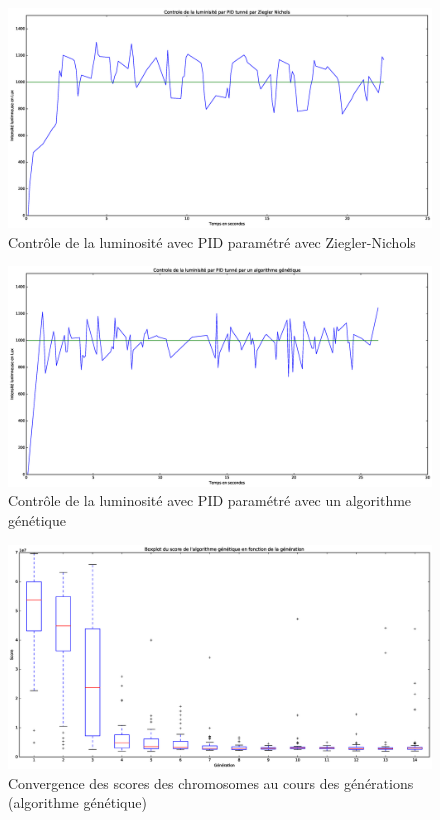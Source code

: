\documentclass[a4paper,10pt]{report}
\begin{document}
\begin{appendices}
\begin{figure}[htb!]
   \centering
   \includegraphics[scale=0.35]{Ziegler.eps}
   \caption{\label{fig:ziegler} Contrôle de la luminosité avec PID paramétré avec Ziegler-Nichols}
\end{figure}

\begin{figure}[htb!]
   \centering
   \includegraphics[scale=0.35]{Genetic.eps}
   \caption{\label{fig:genetique} Contrôle de la luminosité avec PID paramétré avec un algorithme génétique}
\end{figure}

\begin{figure}[htb!]
   \centering
   \includegraphics[scale=0.35]{GeneticBoxplot.eps}
    \caption{\label{fig:convergence} Convergence des scores des chromosomes au cours des générations (algorithme génétique)}
\end{figure}


\end{appendices}
\end{document}
